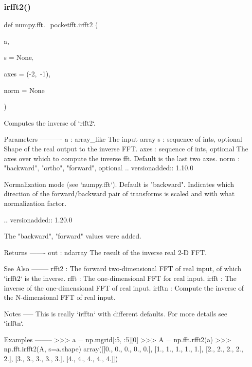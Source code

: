 \subsubsection{\texorpdfstring{irfft2()}{irfft2()}}
{\footnotesize\ttfamily def numpy.\+fft.\+\_\+pocketfft.\+irfft2 (\begin{DoxyParamCaption}\item[{}]{a,  }\item[{}]{s = {\ttfamily None},  }\item[{}]{axes = {\ttfamily (-\/2,~-\/1)},  }\item[{}]{norm = {\ttfamily None} }\end{DoxyParamCaption})}

\begin{DoxyVerb}Computes the inverse of `rfft2`.

Parameters
----------
a : array_like
    The input array
s : sequence of ints, optional
    Shape of the real output to the inverse FFT.
axes : sequence of ints, optional
    The axes over which to compute the inverse fft.
    Default is the last two axes.
norm : {"backward", "ortho", "forward"}, optional
    .. versionadded:: 1.10.0

    Normalization mode (see `numpy.fft`). Default is "backward".
    Indicates which direction of the forward/backward pair of transforms
    is scaled and with what normalization factor.

    .. versionadded:: 1.20.0

        The "backward", "forward" values were added.

Returns
-------
out : ndarray
    The result of the inverse real 2-D FFT.

See Also
--------
rfft2 : The forward two-dimensional FFT of real input,
        of which `irfft2` is the inverse.
rfft : The one-dimensional FFT for real input.
irfft : The inverse of the one-dimensional FFT of real input.
irfftn : Compute the inverse of the N-dimensional FFT of real input.

Notes
-----
This is really `irfftn` with different defaults.
For more details see `irfftn`.

Examples
--------
>>> a = np.mgrid[:5, :5][0]
>>> A = np.fft.rfft2(a)
>>> np.fft.irfft2(A, s=a.shape)
array([[0., 0., 0., 0., 0.],
       [1., 1., 1., 1., 1.],
       [2., 2., 2., 2., 2.],
       [3., 3., 3., 3., 3.],
       [4., 4., 4., 4., 4.]])
\end{DoxyVerb}
 \mbox{\label{namespacenumpy_1_1fft_1_1__pocketfft_a4aa141628960f3642f1e7e3c92b391db}} 
